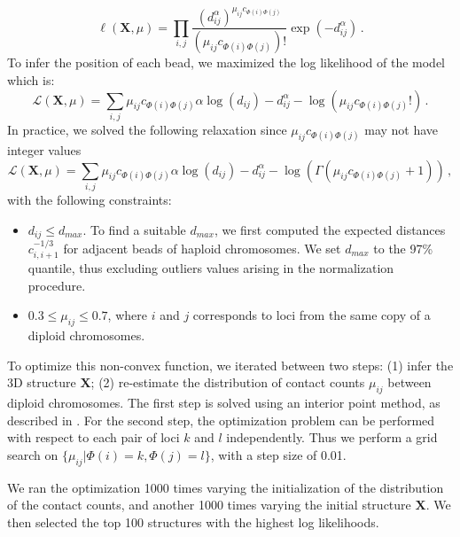 \begin{equation}
\ell(\mathbf{X}, \mu) = \prod_{i, j} \frac{(d_{ij}^{\alpha})^{\mu_{ij}
c_{\Phi(i)\Phi(j)}}}
					   {(\mu_{ij} c_{\Phi(i)\Phi(j)})!}
		         \exp (- d_{ij}^{\alpha}) \,.
\end{equation}
To infer the position of each bead, we maximized the log likelihood of the
model which is:
\begin{equation}
\mathcal{L}(\mathbf{X}, \mu) = \sum_{i, j} \mu_{ij} c_{\Phi(i)\Phi(j)} \alpha \log(d_{ij})
- d_{ij}^{\alpha} - \log(\mu_{ij} c_{\Phi(i)\Phi(j)}!) \,.
\end{equation}
In practice, we solved the following relaxation since $\mu_{ij}c_{\Phi(i)\Phi(j)}$ may not
have integer values
\begin{equation}
\mathcal{L}(\mathbf{X}, \mu) = \sum_{i, j} \mu_{ij} c_{\Phi(i)\Phi(j)} \alpha \log(d_{ij})
- d_{ij}^{\alpha} - \log( \Gamma(\mu_{ij} c_{\Phi(i)\Phi(j)} + 1)) \,,
\end{equation}
with the following constraints:
\begin{itemize}
\item $d_{ij} \leq d_{max}$. To find a suitable $d_{max}$, we first computed
the expected distances $c_{i, i+1} ^{-1 / 3}$ for adjacent beads of haploid
chromosomes. We set $d_{max}$ to the 97\% quantile, thus excluding outliers
values arising in the normalization procedure.
\item $0.3 \leq \mu_{ij} \leq 0.7$, where $i$ and $j$ corresponds to loci from
the same copy of a diploid chromosomes.
\end{itemize}

To optimize this non-convex function, we iterated between two steps: (1) infer
the 3D structure $\mathbf{X}$; (2) re-estimate the distribution of contact counts $\mu_{ij}$ between
diploid chromosomes. The first step is solved using an interior point method,
as described in \cite{varoquaux:statistical}.
For the second step, the optimization problem can be performed with respect to
each pair of loci $k$ and $l$ independently. Thus we perform a grid search
on $\{\mu_{ij} | \Phi(i) = k, \Phi(j) = l\}$, with a step size of 0.01.

We ran the
optimization 1000 times varying the initialization of the distribution of the
contact counts, and another 1000 times varying the initial structure
$\textbf{X}$. We then selected the top 100 structures with the highest log
likelihoods.

\bigskip %

